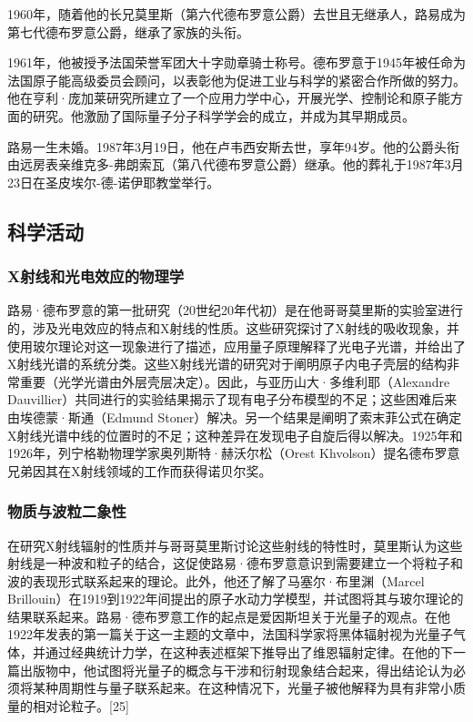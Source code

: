 1960年，随着他的长兄莫里斯（第六代德布罗意公爵）去世且无继承人，路易成为第七代德布罗意公爵，继承了家族的头衔。

1961年，他被授予法国荣誉军团大十字勋章骑士称号。德布罗意于1945年被任命为法国原子能高级委员会顾问，以表彰他为促进工业与科学的紧密合作所做的努力。他在亨利·庞加莱研究所建立了一个应用力学中心，开展光学、控制论和原子能方面的研究。他激励了国际量子分子科学学会的成立，并成为其早期成员。

路易一生未婚。1987年3月19日，他在卢韦西安斯去世，享年94岁。他的公爵头衔由远房表亲维克多-弗朗索瓦（第八代德布罗意公爵）继承。他的葬礼于1987年3月23日在圣皮埃尔-德-诺伊耶教堂举行。
\subsection{科学活动}
\subsubsection{X射线和光电效应的物理学}
路易·德布罗意的第一批研究（20世纪20年代初）是在他哥哥莫里斯的实验室进行的，涉及光电效应的特点和X射线的性质。这些研究探讨了X射线的吸收现象，并使用玻尔理论对这一现象进行了描述，应用量子原理解释了光电子光谱，并给出了X射线光谱的系统分类。这些X射线光谱的研究对于阐明原子内电子壳层的结构非常重要（光学光谱由外层壳层决定）。因此，与亚历山大·多维利耶（Alexandre Dauvillier）共同进行的实验结果揭示了现有电子分布模型的不足；这些困难后来由埃德蒙·斯通（Edmund Stoner）解决。另一个结果是阐明了索末菲公式在确定X射线光谱中线的位置时的不足；这种差异在发现电子自旋后得以解决。1925年和1926年，列宁格勒物理学家奥列斯特·赫沃尔松（Orest Khvolson）提名德布罗意兄弟因其在X射线领域的工作而获得诺贝尔奖。
\subsubsection{物质与波粒二象性}  
在研究X射线辐射的性质并与哥哥莫里斯讨论这些射线的特性时，莫里斯认为这些射线是一种波和粒子的结合，这促使路易·德布罗意意识到需要建立一个将粒子和波的表现形式联系起来的理论。此外，他还了解了马塞尔·布里渊（Marcel Brillouin）在1919到1922年间提出的原子水动力学模型，并试图将其与玻尔理论的结果联系起来。路易·德布罗意工作的起点是爱因斯坦关于光量子的观点。在他1922年发表的第一篇关于这一主题的文章中，法国科学家将黑体辐射视为光量子气体，并通过经典统计力学，在这种表述框架下推导出了维恩辐射定律。在他的下一篇出版物中，他试图将光量子的概念与干涉和衍射现象结合起来，得出结论认为必须将某种周期性与量子联系起来。在这种情况下，光量子被他解释为具有非常小质量的相对论粒子。[25]

